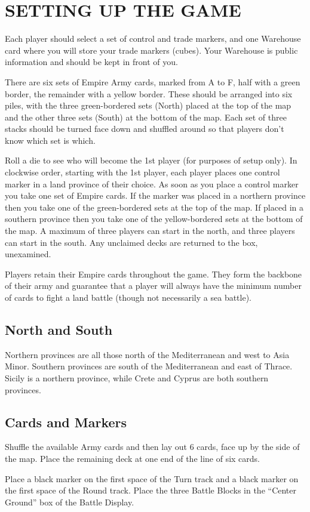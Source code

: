 \section{SETTING UP THE GAME}

Each player should select a set of control and trade markers, and one Warehouse card where you will store your trade markers (cubes). Your Warehouse is public information and should be kept in front of you.

There are six sets of Empire Army cards, marked from A to F, half with a green border, the remainder with a yellow border. These should be arranged into six piles, with the three green-bordered sets (North) placed at the top of the map and the other three sets (South) at the bottom of the map. Each set of three stacks should be turned face down and shuffled around so that players don’t know which set is which.

Roll a die to see who will become the 1st player (for purposes of setup only). In clockwise order, starting with the 1st player, each player places one control marker in a land province of their choice. As soon as you place a control marker you take one set of Empire cards. If the marker was placed in a northern province then you take one of the green-bordered sets at the top of the map. If placed in a southern province then you take one of the yellow-bordered sets at the bottom of the map. A maximum of three players can start in the north, and three players can start in the south. Any unclaimed decks are returned to the box, unexamined.

Players retain their Empire cards throughout the game. They form the backbone of their army and guarantee that a player will always have the minimum number of cards to fight a land battle (though not necessarily a sea battle).

\subsection{North and South}

Northern provinces are all those north of the Mediterranean and west to Asia Minor. Southern provinces are south of the Mediterranean and east of Thrace. Sicily is a northern province, while Crete and Cyprus are both southern provinces.

\subsection{Cards and Markers}

Shuffle the available Army cards and then lay out 6 cards, face up by the side of the map. Place the remaining deck at one end of the line of six cards.

Place a black marker on the first space of the Turn track and a black marker on the first space of the Round track. Place the three Battle Blocks in the “Center Ground” box of the Battle Display.